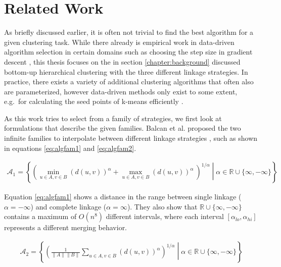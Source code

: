 \chapter{Related Work}
\label{sec:relatedwork}

As briefly discussed earlier, it is often not trivial to find the best algorithm for a given clustering task. While there already is empirical work in data-driven algorithm selection in certain domains such as choosing the step size in gradient descent \cite{DBLP:journals/corr/GuptaR15b}, this thesis focuses on the in section \ref{chapter:background} discussed bottom-up hierarchical clustering with the three different linkage strategies. In practice, there exists a variety of additional clustering algorithms that often also are parameterized, however data-driven methods only exist to some extent, e.g.\ for calculating the seed points of k-means efficiently \cite{arthur2007k}.


As this work tries to select from a family of strategies, we first look at formulations that describe the given families. Balcan et al. proposed the two infinite families to interpolate between different linkage strategies \cite{DBLP:journals/corr/BalcanNVW16}, such as shown in equations \ref{eq:algfam1} and \ref{eq:algfam2}.

\begin{equation}
    \begin{aligned}
        \mathcal{A}_1 = \left\{ \left( \min\limits_{u \in A, v \in B} (d(u,v))^\alpha +  \max\limits_{u \in A, v \in B} (d(u,v))^\alpha\ \right)^{1 / \alpha} \middle| \alpha \in \mathbb{R} \cup \{\infty, -\infty\} \right\}
    \end{aligned}
    \label{eq:algfam1}
\end{equation}

Equation \ref{eq:algfam1} shows a distance in the range between single linkage ($\alpha = -\infty$) and complete linkage ($\alpha = \infty$). They also show that $\mathbb{R} \cup \{\infty, -\infty\}$ contains a maximum of $O(n^8)$ different intervals, where each interval $[\alpha_{lo}, \alpha_{hi}]$ represents a different merging behavior.

\begin{equation}
    \begin{aligned}
        \mathcal{A}_2 = \left\{ \left( \frac{1}{\|A\| \|B\|} \sum\limits_{u \in A, v \in B} (d(u,v))^\alpha \right)^{1 / \alpha} \middle| \alpha \in \mathbb{R} \cup \{\infty, -\infty\} \right\}
    \end{aligned}
    \label{eq:algfam2}
\end{equation}

